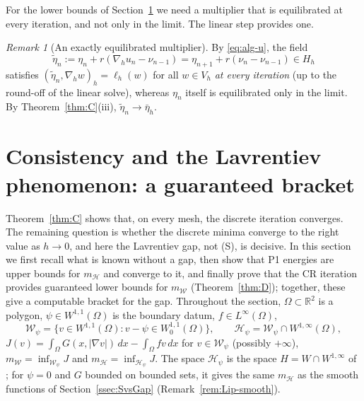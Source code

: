 \documentclass[11pt]{amsart}
\theoremstyle{definition}
\theoremstyle{remark}
\newtheorem{remark}[theorem]{Remark}
\numberwithin{equation}{section}
\newcommand{\R}{\mathbb{R}}
\newcommand{\dx}{\,dx}
\newcommand{\abs}[1]{\lvert #1\rvert}
\newcommand{\Wc}{\mathcal W}
\newcommand{\Hc}{\mathcal H}
\newcommand{\mW}{m_{\mathcal W}}
\newcommand{\mH}{m_{\mathcal H}}
\begin{document}
For the lower bounds of Section~\ref{sec:lavrentiev} we need a multiplier that is equilibrated at every iteration, and not only in the limit. The linear step provides one.

\begin{remark}[An exactly equilibrated multiplier]\label{rem:equilibrated}
By \eqref{eq:alg-u}, the field
\begin{equation}\label{eq:sigma-n}
\tilde\eta_n:=\eta_n+r(\nabla_hu_n-\nu_{n-1})=\eta_{n+1}+r(\nu_n-\nu_{n-1})\in H_h
\end{equation}
satisfies $(\tilde\eta_n,\nabla_hw)_h=\ell_h(w)$ for all $w\in V_h$ \emph{at every iteration} (up to the round-off of the linear solve), whereas $\eta_n$ itself is equilibrated only in the limit. By Theorem~\ref{thm:C}(iii), $\tilde\eta_n\to\bar\eta_h$.

\end{remark}

\section{Consistency and the Lavrentiev phenomenon: a guaranteed bracket}\label{sec:lavrentiev}

Theorem~\ref{thm:C} shows that, on every mesh, the discrete iteration converges. The remaining question is whether the discrete minima converge to the right value as $h\to0$, and here the Lavrentiev gap, not (S), is decisive. In this section we first recall what is known without a gap, then show that P1 energies are upper bounds for $\mH$ and converge to it, and finally prove that the CR iteration provides guaranteed lower bounds for $\mW$ (Theorem~\ref{thm:D}); together, these give a computable bracket for the gap. Throughout the section, $\Omega\subset\R^2$ is a polygon, $\psi\in W^{1,1}(\Omega)$ is the boundary datum, $f\in L^\infty(\Omega)$,
\[
\Wc_\psi=\{v\in W^{1,1}(\Omega):v-\psi\in W^{1,1}_0(\Omega)\},\qquad
\Hc_\psi=\Wc_\psi\cap W^{1,\infty}(\Omega),
\]
$J(v)=\int_\Omega G(x,\abs{\nabla v})\dx-\int_\Omega fv\dx$ for $v\in\Wc_\psi$ (possibly $+\infty$), $\mW=\inf_{\Wc_\psi}J$ and $\mH=\inf_{\Hc_\psi}J$. The space $\Hc_\psi$ is the space $H=W\cap W^{1,\infty}$ of \cite{BalciOrtnerStorn2022}; for $\psi=0$ and $G$ bounded on bounded sets, it gives the same $\mH$ as the smooth functions of Section~\ref{ssec:SvsGap} (Remark~\ref{rem:Lip-smooth}).
\end{document}
